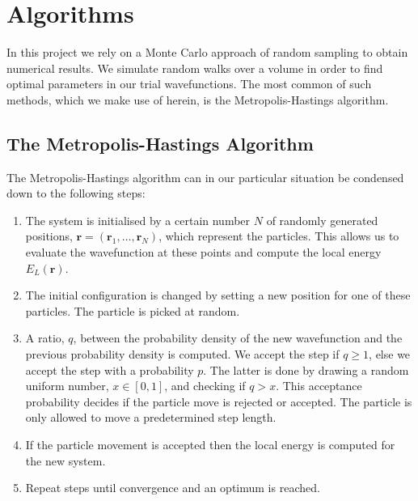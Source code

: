 \documentclass[
    a4paper, aps, twocolumn, floatfix, superscriptaddress,
    nofootinbib]{revtex4-1}
\newcommand{\vf}{\mathbf}
\newcommand{\1}{\mathds{1}}
\begin{document}
\section{Algorithms}
    In this project we rely on a Monte Carlo approach of random sampling to
    obtain numerical results.  We simulate random walks over a volume in order
    to find optimal parameters in our trial wavefunctions.  The most common of
    such methods, which we make use of herein, is the Metropolis-Hastings
    algorithm.

    \subsection{The Metropolis-Hastings Algorithm}
        The Metropolis-Hastings algorithm can in our particular situation be
        condensed down to the following steps:

        \begin{enumerate}
            \item The system is initialised by a certain number $N$ of randomly
                generated positions, $\vf{r} = (\vf{r}_1, \dots, \vf{r}_N)$,
                which represent the particles. This allows us to evaluate the
                wavefunction at these points and compute the local energy
                $E_L(\vf{r})$.

            \item The initial configuration is changed by setting a new position
                for one of these particles. The particle is picked at random.

            \item A ratio, $q$, between the probability density of the new
                wavefunction and the previous probability density is computed.
                We accept the step if $q \geq 1$, else we accept the step with a
                probability $p$. The latter is done by drawing a random uniform
                number, $x \in [0, 1]$, and checking if $q > x$.  This
                acceptance probability decides if the particle move is rejected
                or accepted.  The particle is only allowed to move a
                predetermined step length.

            \item If the particle movement is accepted then the local energy is
                computed for the new system.

            \item Repeat steps until convergence and an optimum is reached.

        \end{enumerate}
\end{document}
